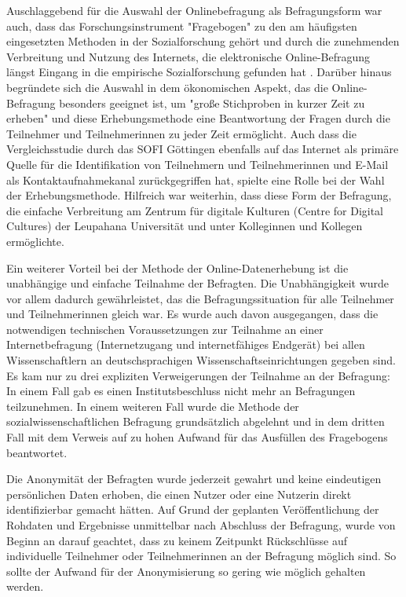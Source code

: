 Auschlaggebend für die Auswahl der Onlinebefragung als Befragungsform war auch, dass das Forschungsinstrument "Fragebogen" zu den am häufigsten eingesetzten Methoden in der Sozialforschung gehört \cite{raab_2012_fragebogen} und durch die zunehmenden Verbreitung und Nutzung des Internets, die elektronische Online-Befragung längst Eingang in die empirische Sozialforschung gefunden hat \cite{Pannewitz_2002}. Darüber hinaus begründete sich die Auswahl in dem ökonomischen Aspekt, das die Online-Befragung besonders geeignet ist, um "große Stichproben in kurzer Zeit zu erheben" \cite{eichhorn_2004_online} und diese Erhebungsmethode eine Beantwortung der Fragen durch die Teilnehmer und Teilnehmerinnen zu jeder Zeit ermöglicht. Auch dass die Vergleichsstudie durch das SOFI Göttingen ebenfalls auf das Internet als primäre Quelle für die Identifikation von Teilnehmern und Teilnehmerinnen und E-Mail als Kontaktaufnahmekanal zurückgegriffen hat, spielte eine Rolle bei der Wahl der Erhebungsmethode. Hilfreich war weiterhin, dass diese Form der Befragung, die einfache Verbreitung am Zentrum für digitale Kulturen (Centre for Digital Cultures) der Leupahana Universität und unter Kolleginnen und Kollegen ermöglichte.

Ein weiterer Vorteil bei der Methode der Online-Datenerhebung ist die unabhängige und einfache Teilnahme der Befragten. Die Unabhängigkeit wurde vor allem dadurch gewährleistet, das die Befragungssituation für alle Teilnehmer und Teilnehmerinnen gleich war. Es wurde auch davon ausgegangen, dass die notwendigen technischen Voraussetzungen zur Teilnahme an einer Internetbefragung (Internetzugang und internetfähiges Endgerät) bei allen Wissenschaftlern an deutschsprachigen Wissenschaftseinrichtungen gegeben sind. Es kam nur zu drei expliziten Verweigerungen der Teilnahme an der Befragung: In einem Fall gab es einen Institutsbeschluss nicht mehr an Befragungen teilzunehmen. In einem weiteren Fall wurde die Methode der sozialwissenschaftlichen Befragung grundsätzlich abgelehnt und in dem dritten Fall mit dem Verweis auf zu hohen Aufwand für das Ausfüllen des Fragebogens beantwortet.

Die Anonymität der Befragten wurde jederzeit gewahrt und keine eindeutigen persönlichen Daten erhoben, die einen Nutzer oder eine Nutzerin direkt identifizierbar gemacht hätten. Auf Grund der geplanten Veröffentlichung der Rohdaten und Ergebnisse unmittelbar nach Abschluss der Befragung, wurde von Beginn an darauf geachtet, dass zu keinem Zeitpunkt Rückschlüsse auf individuelle Teilnehmer oder Teilnehmerinnen an der Befragung möglich sind. So sollte der Aufwand für der Anonymisierung so gering wie möglich gehalten werden.

